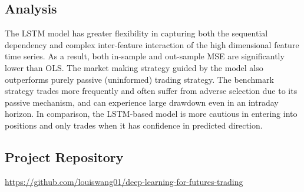\documentclass{article}
\begin{document}
\subsection{Analysis}

The LSTM model has greater flexibility in capturing both the sequential dependency and complex inter-feature interaction of the high dimensional feature time series. As a result, both in-sample and out-sample MSE are significantly lower than OLS. The market making strategy guided by the model also outperforms purely passive (uninformed) trading strategy. The benchmark strategy trades more frequently and often suffer from adverse selection due to its passive mechanism, and can experience large drawdown even in an intraday horizon. In comparison, the LSTM-based model is more cautious in entering into positions and only trades when it has confidence in predicted direction.

\subsection{Project Repository}
\href{https://github.com/louiswang01/deep-learning-for-futures-trading}{https://github.com/louiswang01/deep-learning-for-futures-trading}



\end{document}
